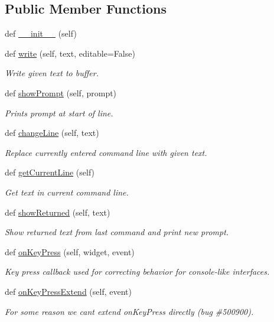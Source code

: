 \subsection*{Public Member Functions}
\begin{DoxyCompactItemize}
\item 
def \hyperlink{classvisualizer_1_1ipython__view_1_1ConsoleView_a8d033bc05540b44d393b8ef5394036a8}{\+\_\+\+\_\+init\+\_\+\+\_\+} (self)
\item 
def \hyperlink{classvisualizer_1_1ipython__view_1_1ConsoleView_a19f2656c5c9822c00374e8048ba9ffea}{write} (self, text, editable=False)
\begin{DoxyCompactList}\small\item\em Write given text to buffer. \end{DoxyCompactList}\item 
def \hyperlink{classvisualizer_1_1ipython__view_1_1ConsoleView_adb014c121dfb0f6769703baa258787e0}{show\+Prompt} (self, prompt)
\begin{DoxyCompactList}\small\item\em Prints prompt at start of line. \end{DoxyCompactList}\item 
def \hyperlink{classvisualizer_1_1ipython__view_1_1ConsoleView_a2294e6c3bf8231b2c18d35c1d92ea329}{change\+Line} (self, text)
\begin{DoxyCompactList}\small\item\em Replace currently entered command line with given text. \end{DoxyCompactList}\item 
def \hyperlink{classvisualizer_1_1ipython__view_1_1ConsoleView_a7532653c420d8ff9797f7dc3a0fa3548}{get\+Current\+Line} (self)
\begin{DoxyCompactList}\small\item\em Get text in current command line. \end{DoxyCompactList}\item 
def \hyperlink{classvisualizer_1_1ipython__view_1_1ConsoleView_af9d7e1de7e8e53a6c91862fca21747e4}{show\+Returned} (self, text)
\begin{DoxyCompactList}\small\item\em Show returned text from last command and print new prompt. \end{DoxyCompactList}\item 
def \hyperlink{classvisualizer_1_1ipython__view_1_1ConsoleView_afa9fdb78cf6e461f4ae4fec60df73bba}{on\+Key\+Press} (self, widget, event)
\begin{DoxyCompactList}\small\item\em Key press callback used for correcting behavior for console-\/like interfaces. \end{DoxyCompactList}\item 
def \hyperlink{classvisualizer_1_1ipython__view_1_1ConsoleView_a908fbc53a7daea691408ef73875eaf60}{on\+Key\+Press\+Extend} (self, event)
\begin{DoxyCompactList}\small\item\em For some reason we can\textquotesingle{}t extend on\+Key\+Press directly (bug \#500900). \end{DoxyCompactList}\end{DoxyCompactItemize}

